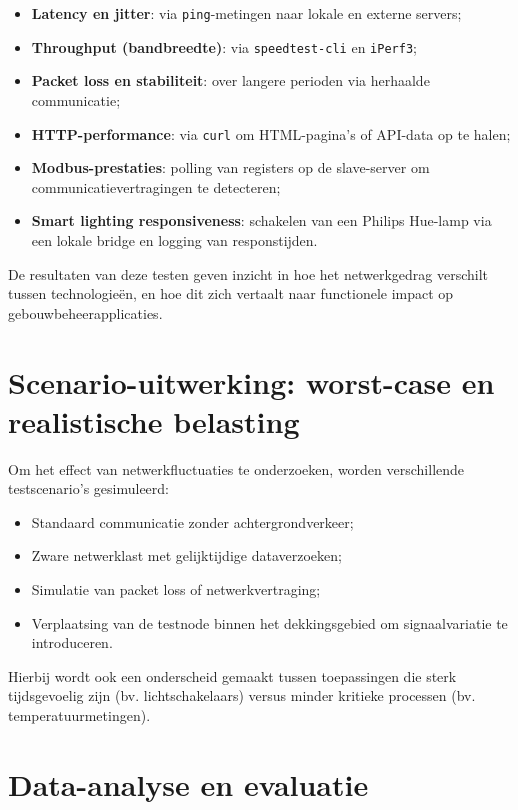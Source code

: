 \begin{itemize}
    \item \textbf{Latency en jitter}: via \texttt{ping}-metingen naar lokale en externe servers;
    \item \textbf{Throughput (bandbreedte)}: via \texttt{speedtest-cli} en \texttt{iPerf3};
    \item \textbf{Packet loss en stabiliteit}: over langere perioden via herhaalde communicatie;
    \item \textbf{HTTP-performance}: via \texttt{curl} om HTML-pagina’s of API-data op te halen;
    \item \textbf{Modbus-prestaties}: polling van registers op de slave-server om communicatievertragingen te detecteren;
    \item \textbf{Smart lighting responsiveness}: schakelen van een Philips Hue-lamp via een lokale bridge en logging van responstijden.
\end{itemize}

De resultaten van deze testen geven inzicht in hoe het netwerkgedrag verschilt tussen technologieën, en hoe dit zich vertaalt naar functionele impact op gebouwbeheerapplicaties.

\section{Scenario-uitwerking: worst-case en realistische belasting}

Om het effect van netwerkfluctuaties te onderzoeken, worden verschillende testscenario’s gesimuleerd:

\begin{itemize}
    \item Standaard communicatie zonder achtergrondverkeer;
    \item Zware netwerklast met gelijktijdige dataverzoeken;
    \item Simulatie van packet loss of netwerkvertraging;
    \item Verplaatsing van de testnode binnen het dekkingsgebied om signaalvariatie te introduceren.
\end{itemize}

Hierbij wordt ook een onderscheid gemaakt tussen toepassingen die sterk tijdsgevoelig zijn (bv. lichtschakelaars) versus minder kritieke processen (bv. temperatuurmetingen).

\section{Data-analyse en evaluatie}

